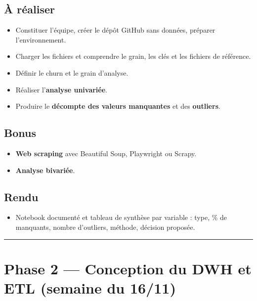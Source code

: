 \documentclass[11pt,a4paper]{article}
\providecommand{\tightlist}{\setlength{\itemsep}{0pt}\setlength{\parskip}{0pt}}
\begin{document}
\subsection{À réaliser}\label{uxe0-ruxe9aliser}

\begin{itemize}
\tightlist
\item
  Constituer l'équipe, créer le dépôt GitHub sans données, préparer
  l'environnement.
\item
  Charger les fichiers et comprendre le grain, les clés et les fichiers
  de référence.
\item
  Définir le churn et le grain d'analyse.
\item
  Réaliser l'\textbf{analyse univariée}.
\item
  Produire le \textbf{décompte des valeurs manquantes} et des
  \textbf{outliers}.
\end{itemize}

\subsection{Bonus}\label{bonus}

\begin{itemize}
\tightlist
\item
  \textbf{Web scraping} avec Beautiful Soup, Playwright ou Scrapy.
\item
  \textbf{Analyse bivariée}.
\end{itemize}

\subsection{Rendu}\label{rendu}

\begin{itemize}
\tightlist
\item
  Notebook documenté et tableau de synthèse par variable : type, \% de
  manquants, nombre d'outliers, méthode, décision proposée.
\end{itemize}

\begin{center}\rule{0.5\linewidth}{0.5pt}\end{center}

\section{Phase 2 --- Conception du DWH et ETL (semaine du
16/11)}\label{phase-2-conception-du-dwh-et-etl-semaine-du-1611}
\end{document}
